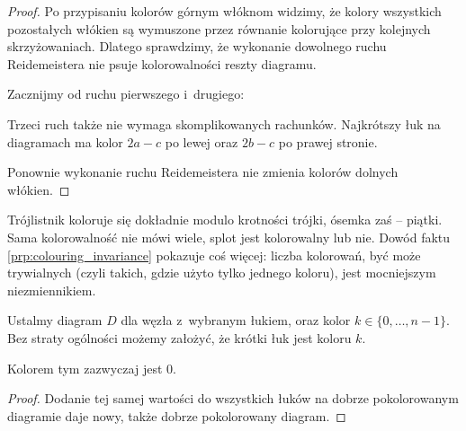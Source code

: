 \begin{proof}
    Po przypisaniu kolorów górnym włóknom widzimy, że kolory wszystkich pozostałych włókien są wymuszone przez równanie kolorujące przy kolejnych skrzyżowaniach.
    Dlatego sprawdzimy, że wykonanie dowolnego ruchu Reidemeistera nie psuje kolorowalności reszty diagramu.
    
    Zacznijmy od ruchu pierwszego i~drugiego:

    Trzeci ruch także nie wymaga skomplikowanych rachunków.
    Najkrótszy łuk na diagramach ma kolor $2a-c$ po lewej oraz $2b-c$ po prawej stronie.

    Ponownie wykonanie ruchu Reidemeistera nie zmienia kolorów dolnych włókien.
\end{proof}

Trójlistnik koloruje się dokładnie modulo krotności trójki, ósemka zaś -- piątki.
Sama kolorowalność nie mówi wiele, splot jest kolorowalny lub nie.
Dowód faktu \ref{prp:colouring_invariance} pokazuje coś więcej: liczba kolorowań, być może trywialnych (czyli takich, gdzie użyto tylko jednego koloru), jest mocniejszym niezmiennikiem.

\begin{lemma}
\label{lem:colouring_arc}%
    Ustalmy diagram $D$ dla węzła z~wybranym łukiem, oraz kolor $k \in \{0, \ldots, n - 1\}$.
    Bez straty ogólności możemy założyć, że krótki łuk jest koloru $k$.
\end{lemma}

Kolorem tym zazwyczaj jest $0$.

\begin{proof}
    Dodanie tej samej wartości do wszystkich łuków na dobrze pokolorowanym diagramie daje nowy, także dobrze pokolorowany diagram.
\end{proof}

